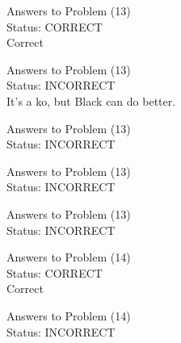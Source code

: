 \documentclass[11pt]{article}
\begin{document}
\begin{minipage}[t]{0.5\textwidth}
  {\centering
  
  Answers to Problem (13)\\
  Status: CORRECT\\
  Correct\\
  }
\end{minipage}
\begin{minipage}[t]{0.5\textwidth}
  {\centering
  
  Answers to Problem (13)\\
  Status: INCORRECT\\
  It's a ko, but Black can do better.\\
  }
\end{minipage}
\begin{minipage}[t]{0.5\textwidth}
  {\centering
  
  Answers to Problem (13)\\
  Status: INCORRECT\\
  
  }
\end{minipage}
\begin{minipage}[t]{0.5\textwidth}
  {\centering
  
  Answers to Problem (13)\\
  Status: INCORRECT\\
  
  }
\end{minipage}
\begin{minipage}[t]{0.5\textwidth}
  {\centering
  
  Answers to Problem (13)\\
  Status: INCORRECT\\
  
  }
\end{minipage}
\begin{minipage}[t]{0.5\textwidth}
  {\centering
  
  Answers to Problem (14)\\
  Status: CORRECT\\
  Correct\\
  }
\end{minipage}
\begin{minipage}[t]{0.5\textwidth}
  {\centering
  
  Answers to Problem (14)\\
  Status: INCORRECT\\
  
  }
\end{minipage}
\end{document}
